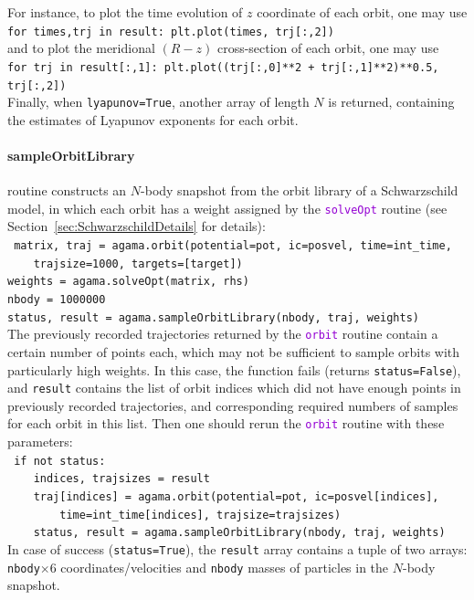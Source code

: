 \documentclass[12pt]{article}
\newcommand{\ttt}[1]{\textcolor{darkviolet}{\texttt{#1}}}
\begin{document}
For instance, to plot the time evolution of $z$ coordinate of each orbit, one may use\\
\texttt{for times,trj in result: plt.plot(times, trj[:,2])}\\
and to plot the meridional $(R-z)$ cross-section of each orbit, one may use\\
\texttt{for trj in result[:,1]: plt.plot((trj[:,0]**2 + trj[:,1]**2)**0.5, trj[:,2])}\\
Finally, when \texttt{lyapunov=True}, another array of length $N$ is returned, containing the estimates of Lyapunov exponents for each orbit.

\paragraph{sampleOrbitLibrary} routine constructs an $N$-body snapshot from the orbit library of a Schwarzschild model, in which each orbit has a weight assigned by the \ttt{solveOpt} routine (see Section~\ref{sec:SchwarzschildDetails} for details):\\
\texttt{
matrix, traj = agama.orbit(potential=pot, ic=posvel, time=int_time, \\
\mbox{}~~~~trajsize=1000, targets=[target])\\
weights = agama.solveOpt(matrix, rhs)\\
nbody = 1000000\\
status, result = agama.sampleOrbitLibrary(nbody, traj, weights)}\\
The previously recorded trajectories returned by the \ttt{orbit} routine contain a certain number of points each, which may not be sufficient to sample orbits with particularly high weights. In this case, the function fails (returns \texttt{status=False}), and \texttt{result} contains the list of orbit indices which did not have enough points in previously recorded trajectories, and corresponding required numbers of samples for each orbit in this list. Then one should rerun the \ttt{orbit} routine with these parameters:\\
\texttt{
if not status:\\
\mbox{}~~~~indices, trajsizes = result\\
\mbox{}~~~~traj[indices] = agama.orbit(potential=pot, ic=posvel[indices], \\
\mbox{}~~~~~~~~time=int_time[indices], trajsize=trajsizes)\\
\mbox{}~~~~status, result = agama.sampleOrbitLibrary(nbody, traj, weights)}\\
In case of success (\texttt{status=True}), the \texttt{result} array contains a tuple of two arrays: \texttt{nbody}$\times6$ coordinates/velocities and \texttt{nbody} masses of particles in the $N$-body snapshot.
\end{document}
